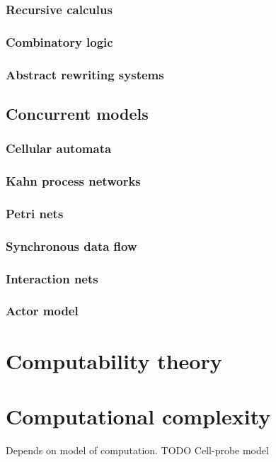 \subsubsection{Recursive calculus}
\subsubsection{Combinatory logic}
\subsubsection{Abstract rewriting systems}
\subsection{Concurrent models}
\subsubsection{Cellular automata}
\subsubsection{Kahn process networks}
\subsubsection{Petri nets}
\subsubsection{Synchronous data flow}
\subsubsection{Interaction nets}
\subsubsection{Actor model}
\section{Computability theory}
\section{Computational complexity}
Depends on model of computation. TODO Cell-probe model